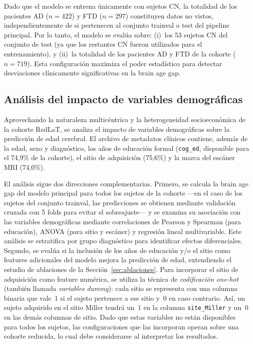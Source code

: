 Dado que el modelo se entrena únicamente con sujetos CN, la totalidad de los pacientes AD ($n = 422$) y FTD ($n = 297$) constituyen datos no vistos, independientemente de si pertenecen al conjunto trainval o test del pipeline principal. Por lo tanto, el modelo se evalúa sobre: (i)~los 53 sujetos CN del conjunto de test (ya que los restantes CN fueron utilizados para el entrenamiento), y (ii)~la totalidad de los pacientes AD y FTD de la cohorte ($n = 719$). Esta configuración maximiza el poder estadístico para detectar desviaciones clínicamente significativas en la brain age gap.

\subsection{Análisis del impacto de variables demográficas}
\label{sec:demo_method}

Aprovechando la naturaleza multicéntrica y la heterogeneidad socioeconómica de la cohorte RedLaT, se analiza el impacto de variables demográficas sobre la predicción de edad cerebral. El archivo de metadatos clínicos contiene, además de la edad, sexo y diagnóstico, los años de educación formal (\texttt{cog\_ed}, disponible para el 74,9\% de la cohorte), el sitio de adquisición (75,6\%) y la marca del escáner MRI (74,0\%).

El análisis sigue dos direcciones complementarias. Primero, se calcula la brain age gap del modelo principal para todos los sujetos de la cohorte ---en el caso de los sujetos del conjunto trainval, las predicciones se obtienen mediante validación cruzada con 5 folds para evitar el sobreajuste--- y se examina su asociación con las variables demográficas mediante correlaciones de Pearson y Spearman (para educación), ANOVA (para sitio y escáner) y regresión lineal multivariable. Este análisis se estratifica por grupo diagnóstico para identificar efectos diferenciales. Segundo, se evalúa si la inclusión de los años de educación y/o el sitio como features adicionales del modelo mejora la predicción de edad, extendiendo el estudio de ablaciones de la Sección~\ref{sec:ablaciones}. Para incorporar el sitio de adquisición como feature numérica, se utiliza la técnica de \textit{codificación one-hot} (también llamada \textit{variables dummy}): cada sitio se representa con una columna binaria que vale~1 si el sujeto pertenece a ese sitio y~0 en caso contrario. Así, un sujeto adquirido en el sitio Miller tendrá un~1 en la columna \texttt{site\_Miller} y un~0 en las demás columnas de sitio. Dado que estas variables no están disponibles para todos los sujetos, las configuraciones que las incorporan operan sobre una cohorte reducida, lo cual debe considerarse al interpretar los resultados.


